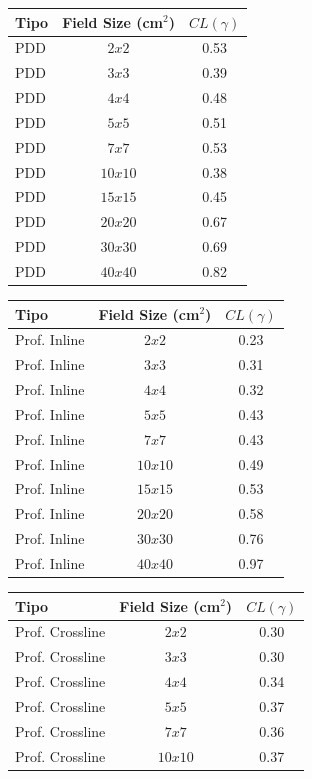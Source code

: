 \begin{table}
\centering
{}

\begin{tabular}{lcc}
\toprule
Tipo & Field Size (cm$^2$) & $CL(\gamma)$\\
\midrule
PDD & $2x2$ & 0.53\\
PDD & $3x3$ & 0.39\\
PDD & $4x4$ & 0.48\\
PDD & $5x5$ & 0.51\\
PDD & $7x7$ & 0.53\\
PDD & $10x10$ & 0.38\\
PDD & $15x15$ & 0.45\\
PDD & $20x20$ & 0.67\\
PDD & $30x30$ & 0.69\\
PDD & $40x40$ & 0.82\\
\bottomrule
\end{tabular}
\vspace*{.2cm}
\begin{tabular}{lcc}
\toprule
Tipo & Field Size (cm$^2$) & $CL(\gamma)$\\
\midrule
Prof. Inline & $2x2$ & 0.23\\
Prof. Inline & $3x3$ & 0.31\\
Prof. Inline & $4x4$ & 0.32\\
Prof. Inline & $5x5$ & 0.43\\
Prof. Inline & $7x7$ & 0.43\\
Prof. Inline & $10x10$ & 0.49\\
Prof. Inline & $15x15$ & 0.53\\
Prof. Inline & $20x20$ & 0.58\\
Prof. Inline & $30x30$ & 0.76\\
Prof. Inline & $40x40$ & 0.97\\
\bottomrule
\end{tabular}
\vspace*{.2cm}
\begin{tabular}{lcc}
\toprule
Tipo & Field Size (cm$^2$) & $CL(\gamma)$\\
\midrule
Prof. Crossline & $2x2$ & 0.30\\
Prof. Crossline & $3x3$ & 0.30\\
Prof. Crossline & $4x4$ & 0.34\\
Prof. Crossline & $5x5$ & 0.37\\
Prof. Crossline & $7x7$ & 0.36\\
Prof. Crossline & $10x10$ & 0.37\\

\end{tabular}
\end{table}

